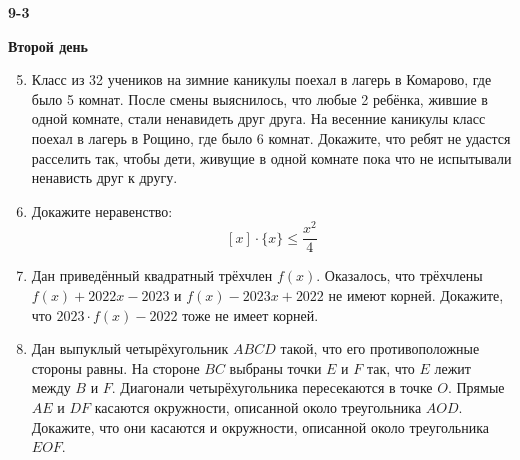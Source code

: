 \documentclass{article}
\begin{document}
\large
	
\begin{center}
	\LARGE\textbf{9-3}
\end{center}
\begin{center}
	\large\textbf{Второй день}
\end{center}


\begin{enumerate}[label*=9.{\arabic{enumi}}]
\setcounter{enumi}{4}
\item Класс из 32 учеников на зимние каникулы поехал в лагерь в Комарово, где было 5 комнат. После смены выяснилось, что любые 2 ребёнка, жившие в одной комнате, стали ненавидеть друг друга. На весенние каникулы класс поехал в лагерь в Рощино, где было 6 комнат. Докажите, что ребят не удастся расселить так, чтобы дети, живущие в одной комнате пока что не испытывали ненависть друг к другу.

\item Докажите неравенство: $$[x]\cdot\{x\} \leqslant \frac{x^2}{4}$$

\item Дан приведённый квадратный трёхчлен $f(x)$. Оказалось, что трёхчлены $f(x) + 2022x - 2023$ и  $f(x) - 2023x + 2022$ не имеют корней. Докажите, что $2023\cdot f(x) - 2022$ тоже не имеет корней.

\item Дан выпуклый четырёхугольник $ABCD$ такой, что его противоположные стороны равны. На стороне $BC$ выбраны точки $E$ и $F$ так, что $E$ лежит между $B$ и $F$. Диагонали четырёхугольника пересекаются в точке $O$. Прямые $AE$ и $DF$ касаются окружности, описанной около треугольника $AOD$. Докажите, что они касаются и окружности, описанной около треугольника $EOF$.

\end{enumerate}
\end{document}
